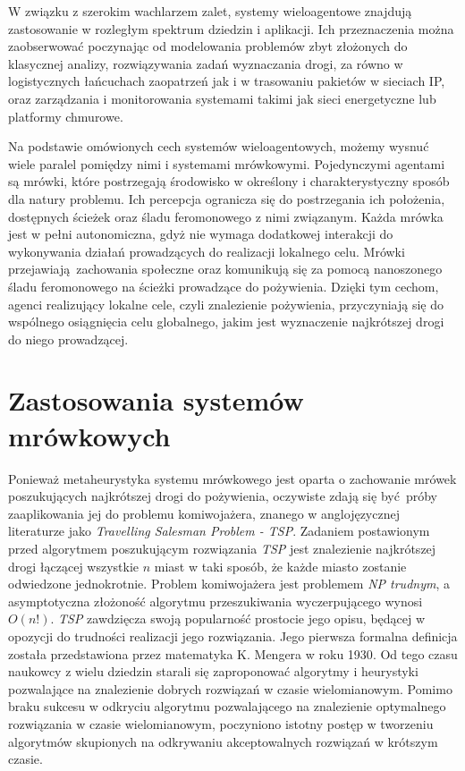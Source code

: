 {{        %
        W związku z szerokim wachlarzem zalet, systemy wieloagentowe znajdują zastosowanie w rozległym spektrum dziedzin
        i aplikacji. Ich przeznaczenia można zaobserwować poczynając od modelowania problemów zbyt złożonych do
        klasycznej analizy, rozwiązywania zadań wyznaczania drogi, za równo w logistycznych łańcuchach zaopatrzeń jak i
        w trasowaniu pakietów w sieciach IP, oraz zarządzania i monitorowania systemami takimi jak sieci energetyczne
        lub platformy chmurowe\cite{Dorri2018MultiAgentSA, Oprea2004ApplicationsOM}.

        Na podstawie omówionych cech systemów wieloagentowych, możemy wysnuć wiele paralel pomiędzy nimi i systemami
        mrówkowymi. Pojedynczymi agentami są mrówki, które postrzegają środowisko w określony i charakterystyczny sposób
        dla natury problemu. Ich percepcja ogranicza się do postrzegania ich położenia, dostępnych ścieżek oraz śladu
        feromonowego z nimi związanym. Każda mrówka jest w pełni autonomiczna, gdyż nie wymaga dodatkowej interakcji do
        wykonywania działań prowadzących do realizacji lokalnego celu. Mrówki przejawiają zachowania społeczne oraz
        komunikują się za pomocą nanoszonego śladu feromonowego na ścieżki prowadzące do pożywienia. Dzięki tym cechom,
        agenci realizujący lokalne cele, czyli znalezienie pożywienia, przyczyniają się do wspólnego osiągnięcia celu
        globalnego, jakim jest wyznaczenie najkrótszej drogi do niego prowadzącej.
    }

    \section{Zastosowania systemów mrówkowych}
    {
        Ponieważ metaheurystyka systemu mrówkowego jest oparta o zachowanie mrówek poszukujących najkrótszej drogi do
        pożywienia, oczywiste zdają się być próby zaaplikowania jej do problemu komiwojażera, znanego w anglojęzycznej
        literaturze jako \textit{Travelling Salesman Problem - TSP}. Zadaniem postawionym przed algorytmem poszukującym
        rozwiązania \textit{TSP} jest znalezienie najkrótszej drogi łączącej wszystkie $n$ miast w taki sposób, że każde
        miasto zostanie odwiedzone jednokrotnie. Problem komiwojażera jest problemem \textit{NP trudnym}, a
        asymptotyczna złożoność algorytmu przeszukiwania wyczerpującego wynosi $O(n!)$. \textit{TSP} zawdzięcza swoją
        popularność prostocie jego opisu, będącej w opozycji do trudności realizacji jego rozwiązania. Jego pierwsza
        formalna definicja została przedstawiona przez matematyka K. Mengera w roku
        1930\cite{Mazidi2017MetaHeuristicAF}. Od tego czasu naukowcy z wielu dziedzin starali się zaproponować algorytmy
        i heurystyki pozwalające na znalezienie dobrych rozwiązań w czasie wielomianowym. Pomimo braku sukcesu w
        odkryciu algorytmu pozwalającego na znalezienie optymalnego rozwiązania w czasie wielomianowym, poczyniono
        istotny postęp w tworzeniu algorytmów skupionych na odkrywaniu akceptowalnych rozwiązań w krótszym czasie.

}}
